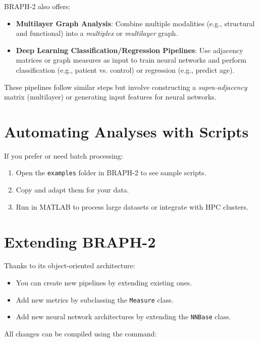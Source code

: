 \documentclass[justified]{tufte-handout}
\begin{document}
BRAPH-2 also offers:
\begin{itemize}

\item \textbf{Multilayer Graph Analysis}: Combine multiple modalities (e.g., structural and functional) into a \textit{multiplex} or \textit{multilayer} graph.

\item \textbf{Deep Learning Classification/Regression Pipelines}: Use adjacency matrices or graph measures as input to train neural networks and perform classification (e.g., patient vs. control) or regression (e.g., predict age).

\end{itemize}
These pipelines follow similar steps but involve constructing a \textit{supra-adjacency} matrix (multilayer) or generating input features for neural networks.

\section{Automating Analyses with Scripts}

If you prefer or need batch processing:
\begin{enumerate}

\item Open the \texttt{examples} folder in BRAPH-2 to see sample scripts.

\item Copy and adapt them for your data.  

\item Run in MATLAB to process large datasets or integrate with HPC clusters.

\end{enumerate}

\section{Extending BRAPH-2}

Thanks to its object-oriented architecture:
\begin{itemize}

\item You can create new pipelines by extending existing ones.

\item Add new metrics by subclassing the \texttt{Measure} class.

\item Add new neural network architectures by extending the \texttt{NNBase} class.

\end{itemize}
All changes can be compiled using the command:
\end{document}
